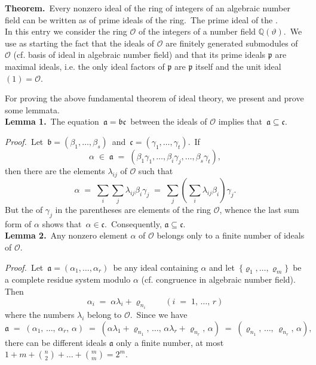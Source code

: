 \documentclass[12pt]{article}
\theoremstyle{definition}
\begin{document}
 


\textbf{Theorem.}\, Every nonzero ideal of the ring of integers of an algebraic number field can be written as  of prime ideals of the ring.\, The prime ideal  of the .\\

In this entry we consider the ring $\mathcal{O}$ of the integers of a number field $\mathbb{Q}(\vartheta)$.\, We use as starting  the fact that the ideals of $\mathcal{O}$ are finitely generated submodules of $\mathcal{O}$ (cf. basis of ideal in algebraic number field) and that its prime ideals $\mathfrak{p}$ are maximal ideals, i.e. the only ideal factors of $\mathfrak{p}$ are $\mathfrak{p}$ itself and the unit ideal \,$(1) = \mathcal{O}$.

For proving the above fundamental theorem of ideal theory, we present and prove some lemmata.\\

\textbf{Lemma 1.}\, The equation \,$\mathfrak{a = bc}$\, between the ideals of $\mathcal{O}$ implies that\, 
$\mathfrak{a \subseteq c}$.

\emph{Proof.}\, Let\, $\mathfrak{b} = (\beta_1,\ldots,\beta_s)$\, and\, $\mathfrak{c} = (\gamma_1,\ldots,\gamma_t)$.\, If
$$\alpha \;\in\; \mathfrak{a} \;=\; (\beta_1\gamma_1,\ldots,\beta_i\gamma_j,\ldots,\beta_s\gamma_t),$$
then there are the elements $\lambda_{ij}$ of $\mathcal{O}$ such that
$$\alpha \;=\; \sum_i\sum_j\lambda_{ij}\beta_i\gamma_j 
\;=\; \sum_j\left(\sum_i\lambda_{ij}\beta_i\right)\gamma_j.$$
But the  of $\gamma_j$ in the parentheses are elements of the ring $\mathcal{O}$, whence the last sum form of $\alpha$ shows that\, $\alpha \in \mathfrak{c}$.\, Consequently, $\mathfrak{a \subseteq c}$.\\

\textbf{Lemma 2.}\, Any nonzero element $\alpha$ of $\mathcal{O}$ belongs only to a finite number of ideals of $\mathcal{O}$.

\emph{Proof.}\, Let\, $\mathfrak{a} = (\alpha_1,\ldots,\alpha_r)$\, be any ideal containing $\alpha$ and let\, 
$\{\varrho_1,\ldots,\varrho_m\}$\, be a complete residue system modulo $\alpha$ (cf. congruence in algebraic number field).\, Then
$$\alpha_i \;=\; \alpha\lambda_i\!+\!\varrho_{n_i} \qquad (i \;=\; 1,\,\ldots,\,r)$$
where the numbers $\lambda_i$ belong to $\mathcal{O}$.\, Since we have
$$\mathfrak{a} \;=\; (\alpha_1,\,\ldots,\,\alpha_r,\,\alpha) \;=\; 
(\alpha\lambda_1\!+\!\varrho_{n_1},\,\ldots,\,\alpha\lambda_r\!+\!\varrho_{n_r},\,\alpha)
\;=\; (\varrho_{n_1},\,\ldots,\,\varrho_{n_r},\,\alpha),$$
there can be different ideals $\mathfrak{a}$ only a finite number, at most 
$1\!+\!m\!+\!{n \choose 2}\!+\ldots+\!{m \choose m} = 2^m$.\\
\end{document}

